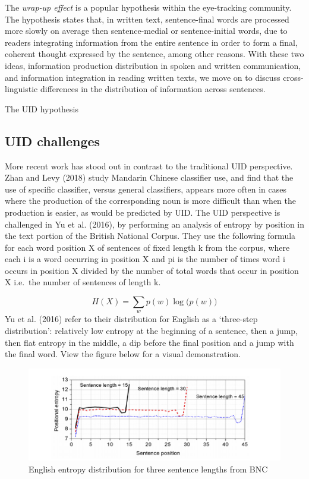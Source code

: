 \documentclass[10pt, letterpaper]{article}
\newenvironment{CodeChunk}{}{}
\begin{document}
The \emph{wrap-up effect} is a popular hypothesis within the
eye-tracking community. The hypothesis states that, in written text,
sentence-final words are processed more slowly on average then
sentence-medial or sentence-initial words, due to readers integrating
information from the entire sentence in order to form a final, coherent
thought expressed by the sentence, among other reasons. With these two
ideas, information production distribution in spoken and written
communication, and information integration in reading written texts, we
move on to discuss cross-linguistic differences in the distribution of
information across sentences.

The UID hypothesis

\subsection{UID challenges}\label{uid-challenges}

More recent work has stood out in contrast to the traditional UID
perspective. Zhan and Levy (2018) study Mandarin Chinese classifier use,
and find that the use of specific classifier, versus general
classifiers, appears more often in cases where the production of the
corresponding noun is more difficult than when the production is easier,
as would be predicted by UID. The UID perspective is challenged in Yu et
al. (2016), by performing an analysis of entropy by position in the text
portion of the British National Corpus. They use the following formula
for each word position X of sentences of fixed length k from the corpus,
where each i is a word occurring in position X and pi is the number of
times word i occurs in position X divided by the number of total words
that occur in position X i.e.~the number of sentences of length k.

\[H(X) = \sum\limits_w p(w)\log\big(p(w)\big)\] Yu et al. (2016) refer
to their distribution for English as a `three-step distribution':
relatively low entropy at the beginning of a sentence, then a jump, then
flat entropy in the middle, a dip before the final position and a jump
with the final word. View the figure below for a visual demonstration.

\begin{CodeChunk}
\begin{figure}[h]

{\centering \includegraphics{figs/yunigram-1} 

}

\caption[English entropy distribution for three sentence lengths from BNC]{English entropy distribution for three sentence lengths from BNC}\label{fig:yunigram}
\end{figure}
\end{CodeChunk}
\end{document}
